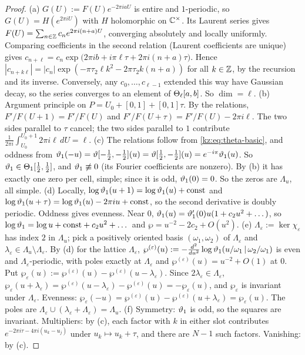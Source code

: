 \begin{proof}
(a) $G(U):=F(U)e^{-2\pi iaU}$ is entire and $1$-periodic, so $G(U)=H(e^{2\pi iU})$ with $H$ holomorphic on
$\mathbb{C}^\times$. Its Laurent series gives $F(U)=\sum_{n\in\mathbb{Z}}c_ne^{2\pi i(n+a)U}$, converging absolutely and
locally uniformly. Comparing coefficients in the second relation (Laurent coefficients are unique) gives
$c_{n+\ell}=c_n\exp\big(2\pi ib+i\pi\ell\tau+2\pi i(n+a)\tau\big)$. Hence
$|c_{n+k\ell}|=|c_n|\exp(-\pi\tau_2\ell k^2-2\pi\tau_2k(n+a))$ for all $k\in\mathbb{Z}$, by the recursion and its
inverse. Conversely, any $c_0,\dots,c_{\ell-1}$ extended this way have Gaussian decay, so the series
converges to an element of $\Theta_\ell[a,b]$. So $\dim=\ell$.
(b) Argument principle on $P=U_0+[0,1]+[0,1]\tau$. By the relations, $F'/F(U+1)=F'/F(U)$ and
$F'/F(U+\tau)=F'/F(U)-2\pi i\ell$. The two sides parallel to $\tau$ cancel; the two sides parallel to $1$
contribute $\frac1{2\pi i}\int_{U_0}^{U_0+1}2\pi i\ell\,dU=\ell$.
(c) The relations follow from \eqref{kz:eq:theta-basic}, and oddness from
$\vartheta_1(-u)=\vartheta[-\frac12,-\frac12](u)=\vartheta[\frac12,-\frac12](u)=e^{-i\pi}\vartheta_1(u)$. So
$\vartheta_1\in\Theta_1[\frac12,\frac12]$, and $\vartheta_1\not\equiv0$ (its Fourier coefficients are nonzero). By (b) it has
exactly one zero per cell, simple; since it is odd, $\vartheta_1(0)=0$. So the zeros are $\Lambda_u$, all simple.
(d) Locally, $\log\vartheta_1(u+1)=\log\vartheta_1(u)+\text{const}$ and $\log\vartheta_1(u+\tau)=\log\vartheta_1(u)-2\pi iu+\text{const}$,
so the second derivative is doubly periodic. Oddness gives evenness. Near $0$,
$\vartheta_1(u)=\vartheta_1'(0)u(1+c_2u^2+\dots)$, so $\log\vartheta_1=\log u+\text{const}+c_2u^2+\dots$ and
$\wp=u^{-2}-2c_2+O(u^2)$.
(e) $\Lambda_\varepsilon:=\ker\chi_\varepsilon$ has index $2$ in $\Lambda_u$; pick a positively oriented basis $(\omega_1,\omega_2)$ of
$\Lambda_\varepsilon$ and $\lambda_\varepsilon\in\Lambda_u\setminus\Lambda_\varepsilon$. By (d) for the lattice $\Lambda_\varepsilon$,
$\wp^{(\varepsilon)}(u):=-\frac{d^2}{du^2}\log\vartheta_1(u/\omega_1\,|\,\omega_2/\omega_1)$ is even and $\Lambda_\varepsilon$-periodic, with
poles exactly at $\Lambda_\varepsilon$ and $\wp^{(\varepsilon)}(u)=u^{-2}+O(1)$ at $0$. Put
$\wp_\varepsilon(u):=\wp^{(\varepsilon)}(u)-\wp^{(\varepsilon)}(u-\lambda_\varepsilon)$. Since $2\lambda_\varepsilon\in\Lambda_\varepsilon$,
$\wp_\varepsilon(u+\lambda_\varepsilon)=\wp^{(\varepsilon)}(u-\lambda_\varepsilon)-\wp^{(\varepsilon)}(u)=-\wp_\varepsilon(u)$, and $\wp_\varepsilon$ is invariant under
$\Lambda_\varepsilon$. Evenness: $\wp_\varepsilon(-u)=\wp^{(\varepsilon)}(u)-\wp^{(\varepsilon)}(u+\lambda_\varepsilon)=\wp_\varepsilon(u)$. The poles are
$\Lambda_\varepsilon\cup(\lambda_\varepsilon+\Lambda_\varepsilon)=\Lambda_u$.
(f) Symmetry: $\vartheta_1$ is odd, so the squares are invariant. Multipliers: by (c), each factor with $k$
in either slot contributes $e^{-2\pi i\tau-4\pi i(u_k-u_j)}$ under $u_k\mapsto u_k+\tau$, and there are $N-1$
such factors. Vanishing: by (c).
\end{proof}

